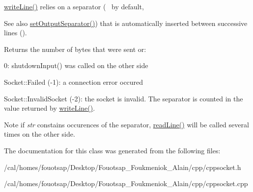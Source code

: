 \hyperlink{classcppu_1_1_socket_buffer_a92ae0351aaee8719d34e8c4618495d59}{write\+Line()} relies on a separator (~\newline
 by default, \begin{DoxySeeAlso}{See also}
\hyperlink{classcppu_1_1_socket_buffer_a0e5e6a9ce3bda28b65c559c8b3c91b0f}{set\+Output\+Separator()}) that is automatically inserted between successive lines ().
\end{DoxySeeAlso}
\begin{DoxyReturn}{Returns}
the number of bytes that were sent or\+:
\begin{DoxyItemize}
\item 0\+: shutdown\+Input() was called on the other side
\item Socket\+::\+Failed (-\/1)\+: a connection error occured
\item Socket\+::\+Invalid\+Socket (-\/2)\+: the socket is invalid. The separator is counted in the value returned by \hyperlink{classcppu_1_1_socket_buffer_a92ae0351aaee8719d34e8c4618495d59}{write\+Line()}.
\end{DoxyItemize}
\end{DoxyReturn}
\begin{DoxyNote}{Note}
if {\itshape str} constains occurences of the separator, \hyperlink{classcppu_1_1_socket_buffer_a222769d3776b9cbd3a727ee1f0e60358}{read\+Line()} will be called several times on the other side. 
\end{DoxyNote}


The documentation for this class was generated from the following files\+:\begin{DoxyCompactItemize}
\item 
/cal/homes/fouotsap/\+Desktop/\+Fouotsap\+\_\+\+Foukmeniok\+\_\+\+Alain/cpp/cppsocket.\+h\item 
/cal/homes/fouotsap/\+Desktop/\+Fouotsap\+\_\+\+Foukmeniok\+\_\+\+Alain/cpp/cppsocket.\+cpp\end{DoxyCompactItemize}

